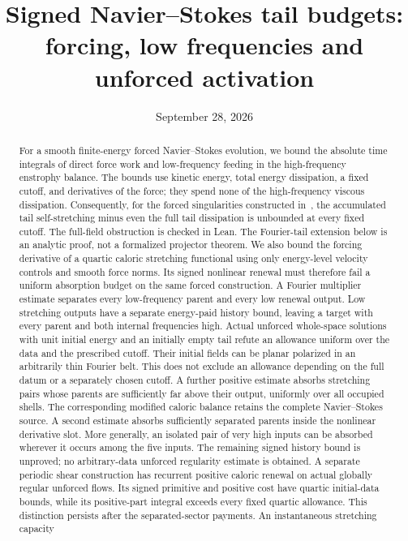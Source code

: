 \documentclass[11pt]{article}
\title{Signed Navier--Stokes tail budgets:\protect\\forcing, low frequencies and unforced activation}
\author{}
\date{September 28, 2026}
\begin{document}
\maketitle
\begin{abstract}
For a smooth finite-energy forced Navier--Stokes evolution, we bound the
absolute time integrals of direct force work and low-frequency feeding
in the high-frequency enstrophy balance. The bounds use kinetic energy,
total energy dissipation, a fixed cutoff, and derivatives of the force;
they spend none of the high-frequency viscous dissipation. Consequently,
for the forced singularities constructed in~\cite{OAI}, the accumulated
tail self-stretching minus even the full tail dissipation is unbounded
at every fixed cutoff. The full-field obstruction is checked in Lean.
The Fourier-tail extension below is an analytic proof, not a formalized
projector theorem. We also bound the forcing derivative of a quartic
caloric stretching functional using only energy-level velocity controls
and smooth force norms. Its signed nonlinear renewal must therefore fail
a uniform absorption budget on the same forced construction. A Fourier
multiplier estimate separates every low-frequency parent and every low
renewal output. Low stretching outputs have a separate energy-paid
history bound, leaving a target with every parent and both internal
frequencies high. Actual unforced whole-space solutions with
unit initial energy and an initially empty tail refute an allowance
uniform over the data and the prescribed cutoff. Their initial fields
can be planar polarized in an arbitrarily thin Fourier belt. This does
not exclude an allowance depending on the full datum or a separately
chosen cutoff. A further positive estimate absorbs stretching pairs whose
parents are sufficiently far above their output, uniformly over all
occupied shells. The corresponding modified caloric balance retains the
complete Navier--Stokes source. A second estimate absorbs sufficiently
separated parents inside the nonlinear derivative slot. More generally,
an isolated pair of very high inputs can be absorbed wherever it occurs
among the five inputs. The remaining signed history bound is unproved;
no arbitrary-data unforced regularity estimate is obtained. A separate
periodic shear construction has recurrent positive caloric renewal on
actual globally regular unforced flows. Its signed primitive and positive
cost have quartic initial-data bounds, while its positive-part integral
exceeds every fixed quartic allowance. This distinction persists after
the separated-sector payments. An instantaneous stretching capacity

\end{abstract}
\end{document}
